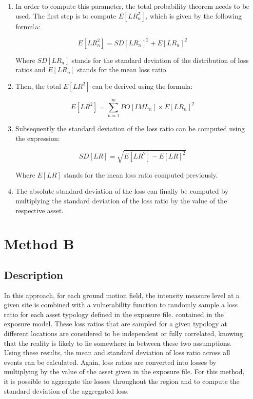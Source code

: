 \begin{enumerate}
\item In order to compute this parameter, the total probability theorem needs to be used. The first step is to compute $E[LR_n^2]$, which is given by the following formula:

\begin{equation}
E[LR_n^2]=SD[LR_n]^2+E[LR_n]^2
\end{equation}

Where $SD[LR_n]$ stands for the standard deviation of the distribution of loss ratios and $E[LR_n]$ stands for the mean loss ratio.

\item Then, the total $E[LR^2]$ can be derived using the formula:

\begin{equation}
E[LR^2]=\sum_{n=1}^mPO[IML_n] \times E[LR_n]^2
\end{equation}

\item Subsequently the standard deviation of the loss ratio can be computed using the expression:

\begin{equation}
SD[LR]=\sqrt{E[LR^2]-E[LR]^2}
\end{equation}

Where $E[LR]$ stands for the mean loss ratio computed previously.

\item The absolute standard deviation of the loss can finally be computed by multiplying the standard deviation of the loss ratio by the value of the respective asset.

\end{enumerate}

\section{Method B}
\subsection{Description}
In this approach, for each ground motion field, the intensity measure level at a given site is combined with a vulnerability function to randomly sample a loss ratio for each asset typology defined in the exposure file. contained in the exposure model. These loss ratios that are sampled for a given typology at different locations are considered to be independent or fully correlated, knowing that the reality is likely to lie somewhere in between these two assumptions. Using these results, the mean and standard deviation of loss ratio across all events can be calculated. Again, loss ratios are converted into losses by multiplying by the value of the asset given in the exposure file. For this method, it is possible to aggregate the losses throughout the region and to compute the standard deviation of the aggregated loss. 

